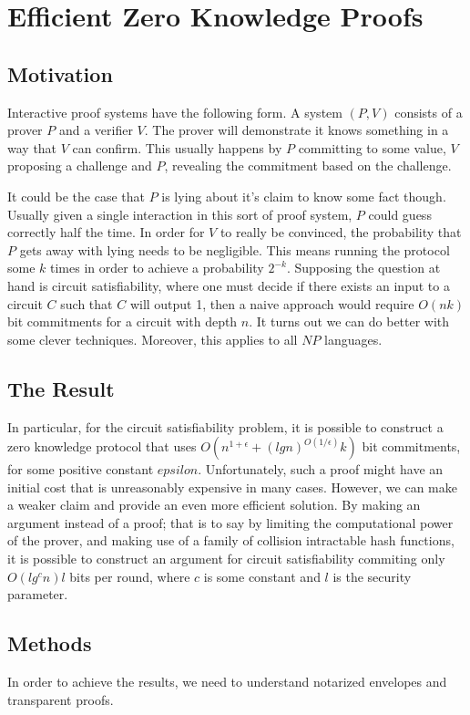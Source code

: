 \documentclass{article}
\begin{document}
\section{Efficient Zero Knowledge Proofs \cite{Kilian92}}

\subsection{Motivation}
Interactive proof systems have the following form. A system $(P,V)$
consists of a prover $P$
and a verifier $V$.
The prover will demonstrate it knows something in a way that $V$
can confirm. This usually happens by $P$
committing to some value, $V$
proposing a challenge and $P$,
revealing the commitment based on the challenge.

It could be the case that $P$
is lying about it's claim to know some fact though. Usually given a
single interaction in this sort of proof system, $P$
could guess correctly half the time. In order for $V$
to really be convinced, the probability that $P$
gets away with lying needs to be negligible. This means running the
protocol some $k$
times in order to achieve a probability $2^{-k}$.
Supposing the question at hand is circuit satisfiability, where one
must decide if there exists an input to a circuit $C$
such that $C$
will output 1, then a naive approach would require $O(nk)$
bit commitments for a circuit with depth $n$.
It turns out we can do better with some clever techniques. Moreover,
this applies to all $NP$ languages.

\subsection{The Result}
In particular, for the circuit satisfiability problem, it is possible
to construct a zero knowledge protocol that uses
$O(n^{1+\epsilon} + (lg n)^{O(1/\epsilon)}k)$
bit commitments, for some positive constant $epsilon$.
Unfortunately, such a proof might have an initial cost that is
unreasonably expensive in many cases. However, we can make a weaker
claim and provide an even more efficient solution. By making an
argument instead of a proof; that is to say by limiting the
computational power of the prover, and making use of a family of
collision intractable hash functions, it is possible to construct an
argument for circuit satisfiability commiting only $O(lg^{c}n)l$
bits per round, where $c$
is some constant and $l$ is the security parameter.

\subsection{Methods}
In order to achieve the results, we need to understand notarized
envelopes and transparent proofs.
\end{document}
